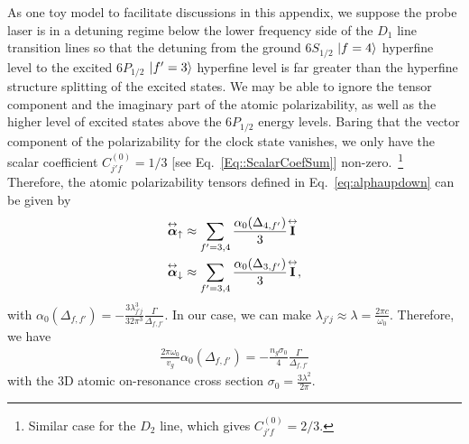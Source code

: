 As one toy model to facilitate discussions in this appendix, we suppose the probe laser is in a detuning regime below the lower frequency side of the $ D_1 $ line transition lines so that the detuning from the ground $ 6S_{1/2} $ $ \lvert{f=4}\rangle $ hyperfine level to the excited $ 6P_{1/2} $ $ \lvert{f'=3}\rangle $ hyperfine level is far greater than the hyperfine structure splitting of the excited states. 
We may be able to ignore the tensor component and the imaginary part of the atomic polarizability, as well as the higher level of excited states above the $ 6P_{1/2} $ energy levels. 
Baring that the vector component of the polarizability for the clock state vanishes, we only have the scalar coefficient $C_{j' f}^{(0)} =1/3  $ [see Eq.~\eqref{Eq::ScalarCoefSum}] non-zero.~\footnote{Similar case for the $ D_2 $ line, which gives $ C_{j' f}^{(0)} =2/3 $.} Therefore, the atomic polarizability tensors defined in Eq.~\eqref{eq:alphaupdown} can be given by
\begin{align}
\overset{\leftrightarrow}{\boldsymbol{\alpha}}_{\uparrow} &\approx\sum_{f'=3,4}\frac{\alpha_0(\Delta_{4,f'})}{3}\overset{\leftrightarrow}{\bf I} \\
\overset{\leftrightarrow}{\boldsymbol{\alpha}}_{\downarrow} &\approx\sum_{f'=3,4}\frac{\alpha_0(\Delta_{3,f'})}{3}\overset{\leftrightarrow}{\bf I},
\end{align}
with $ \alpha_0(\Delta_{f,f'})=-\frac{3\lambda_{j'j}^3}{32\pi^3} \frac{\Gamma}{\Delta_{f,f'}} $. In our case, we can make $ \lambda_{j'j}\approx\lambda= \frac{2\pi c}{\omega_0}$. Therefore, we have
\begin{align}
\frac{2\pi\omega_0}{v_g}\alpha_0(\Delta_{f,f'})=-\frac{n_g\sigma_0}{4} \frac{\Gamma}{\Delta_{f,f'}}
\end{align}
with the 3D atomic on-resonance cross section $ \sigma_0= \frac{3\lambda^2}{2\pi}  $. 

